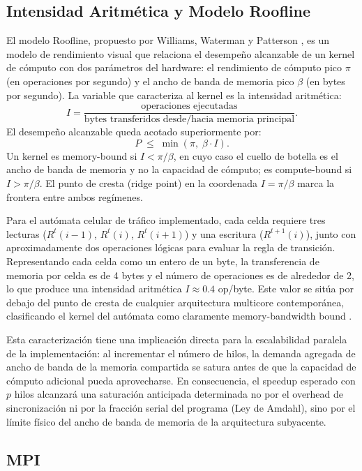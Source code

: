 \subsection{Intensidad Aritmética y Modelo Roofline}

El modelo Roofline, propuesto por Williams, Waterman y Patterson
\parencite{Williams2009}, es un modelo de rendimiento visual que
relaciona el desempeño alcanzable de un kernel de cómputo con dos
parámetros del hardware: el rendimiento de cómputo pico $\pi$ (en
operaciones por segundo) y el ancho de banda de memoria pico $\beta$
(en bytes por segundo). La variable que caracteriza al kernel es la
intensidad aritmética:
\[
  I = \frac{\text{operaciones ejecutadas}}{\text{bytes transferidos
  desde/hacia memoria principal}}.
\]
El desempeño alcanzable queda acotado superiormente por:
\[
  P \;\leq\; \min\!\left(\pi,\; \beta \cdot I\right).
\]
Un kernel es memory-bound si $I < \pi / \beta$, en cuyo caso el cuello
de botella es el ancho de banda de memoria y no la capacidad de cómputo;
es compute-bound si $I > \pi / \beta$. El punto de cresta (ridge point)
en la coordenada $I = \pi / \beta$ marca la frontera entre ambos
regímenes.

Para el autómata celular de tráfico implementado, cada celda requiere
tres lecturas ($R^t(i-1)$, $R^t(i)$, $R^t(i+1)$) y una escritura
($R^{t+1}(i)$), junto con aproximadamente dos operaciones lógicas para
evaluar la regla de transición. Representando cada celda como un entero
de un byte, la transferencia de memoria por celda es de 4 bytes y el
número de operaciones es de alrededor de 2, lo que produce una intensidad
aritmética $I \approx 0.4$ op/byte. Este valor se sitúa por debajo del
punto de cresta de cualquier arquitectura multicore contemporánea,
clasificando el kernel del autómata como claramente memory-bandwidth bound
\parencite{Williams2009}.

Esta caracterización tiene una implicación directa para la escalabilidad
paralela de la implementación: al incrementar el número de hilos, la
demanda agregada de ancho de banda de la memoria compartida se satura
antes de que la capacidad de cómputo adicional pueda aprovecharse. En
consecuencia, el speedup esperado con $p$ hilos alcanzará una saturación
anticipada determinada no por el overhead de sincronización ni por la
fracción serial del programa (Ley de Amdahl), sino por el límite físico
del ancho de banda de memoria de la arquitectura subyacente.

\subsection{MPI}


